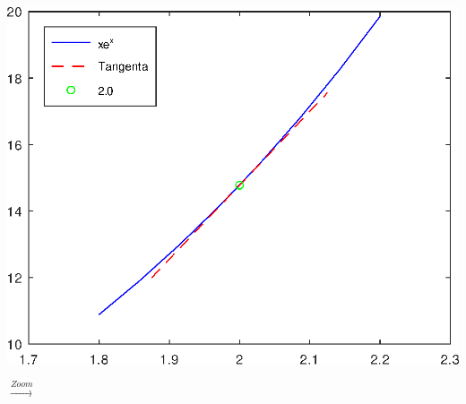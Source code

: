 \documentclass{article}
\begin{document}
\begin{minipage}{0.4\textwidth}
    \includegraphics[scale=0.45]{three_points_mid_ex}
\end{minipage}
{\LARGE$\xrightarrow[]{Zoom}$}\;\;\;\;\;
\begin{minipage}{0.65\textwidth}
\end{minipage}\\
\end{document}
